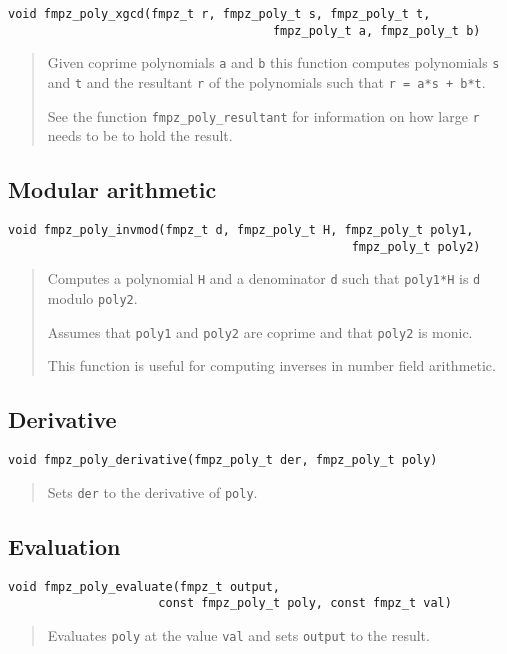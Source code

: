 \documentclass[a4paper,10pt]{article}
\newcommand{\code}{\lstinline}
\begin{document}
\begin{lstlisting}
void fmpz_poly_xgcd(fmpz_t r, fmpz_poly_t s, fmpz_poly_t t, 
                                     fmpz_poly_t a, fmpz_poly_t b)
\end{lstlisting}
\begin{quote}
Given coprime polynomials \code{a} and \code{b} this function computes polynomials \code{s} and \code{t} and the resultant \code{r} of the polynomials such that \code{r = a*s + b*t}.

See the function \code{fmpz_poly_resultant} for information on how large \code{r} needs to be to hold the result.
\end{quote}

\subsection{Modular arithmetic}
\begin{lstlisting}
void fmpz_poly_invmod(fmpz_t d, fmpz_poly_t H, fmpz_poly_t poly1, 
                                                fmpz_poly_t poly2)
\end{lstlisting}
\begin{quote}
Computes a polynomial \code{H} and a denominator \code{d} such that \code{poly1*H} is \code{d} modulo \code{poly2}. 

Assumes that \code{poly1} and \code{poly2} are coprime and that \code{poly2} is monic.

This function is useful for computing inverses in number field arithmetic.
\end{quote}

\subsection{Derivative}
\begin{lstlisting}
void fmpz_poly_derivative(fmpz_poly_t der, fmpz_poly_t poly) 
\end{lstlisting}
\begin{quote}
Sets \code{der} to the derivative of \code{poly}. 
\end{quote}

\subsection{Evaluation}
\begin{lstlisting}
void fmpz_poly_evaluate(fmpz_t output, 
                     const fmpz_poly_t poly, const fmpz_t val) 
\end{lstlisting}
\begin{quote}
Evaluates \code{poly} at the value \code{val} and sets \code{output} to the result. 
\end{quote}
\end{document}
